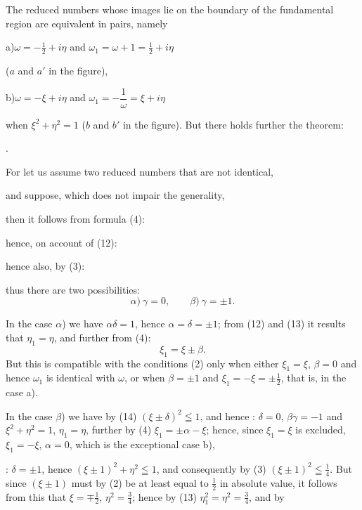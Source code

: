 

The reduced numbers whose images lie on the boundary of the fundamental
region are equivalent in pairs, namely

\noindent a)\quad $\omega = -\tfrac{1}{2} + i\eta$ \quad and \quad $\omega_1 = \omega + 1 = \tfrac{1}{2} + i\eta$

\noindent ($a$ and $a'$ in the figure),

\noindent b)\quad $\omega = -\xi + i\eta$ \quad and \quad $\omega_1 = -\dfrac{1}{\omega} = \xi + i\eta$

\noindent when $\xi^2+\eta^2 = 1$ ($b$ and $b'$ in the figure). But there holds further the
theorem:

.\quad {}

For let us assume two reduced numbers that are not identical,


and suppose, which does not impair the generality,


then it follows from formula (4):


hence, on account of (12):


hence also, by (3):


thus there are two possibilities:
\[
\alpha)\ \gamma = 0, \qquad \beta)\ \gamma = \pm 1.
\]

In the case $\alpha$) we have $\alpha\delta = 1$, hence $\alpha = \delta = \pm 1$; from (12) and (13)
it results that $\eta_1 = \eta$, and further from (4):
\[
\xi_1 = \xi \pm \beta.
\]
But this is compatible with the conditions (2) only when
either $\xi_1 = \xi$, $\beta = 0$ and hence $\omega_1$ is identical with $\omega$, or when
$\beta = \pm 1$ and $\xi_1 = -\xi = \pm \tfrac{1}{2}$, that is, in the case a).

In the case $\beta$) we have by (14) $(\xi \pm \delta)^2 \leqq 1$, and hence :
$\delta = 0$, $\beta\gamma = -1$ and $\xi^2+\eta^2 = 1$, $\eta_1 = \eta$, further by (4)
$\xi_1 = \pm\alpha - \xi$; hence, since $\xi_1 = \xi$ is excluded, $\xi_1 = -\xi$,
$\alpha = 0$, which is the exceptional case b),

: $\delta = \pm 1$, hence $(\xi\pm 1)^2 + \eta^2 \leqq 1$, and consequently by (3)
$(\xi\pm 1)^2 \leqq \tfrac{1}{4}$. But since $(\xi\pm 1)$ must by (2) be at least
equal to $\tfrac{1}{2}$ in absolute value, it follows from this that $\xi = \mp\tfrac{1}{2}$,
$\eta^2 = \tfrac{3}{4}$; hence by (13) $\eta_1^2 = \eta^2 = \tfrac{3}{4}$, and by
